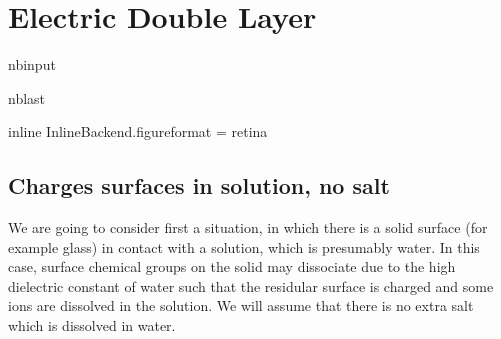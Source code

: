 \documentclass[letterpaper,10pt,english]{sphinxmanual}
\begin{document}
\chapter{Electric Double Layer}
\label{\detokenize{notebooks/L9/1_Electric_Double_Layer:Electric-Double-Layer}}\label{\detokenize{notebooks/L9/1_Electric_Double_Layer::doc}}
\begin{sphinxuseclass}{nbinput}
\begin{sphinxuseclass}{nblast}
{
\begin{sphinxVerbatim}[commandchars=\\\{\}]
\llap{\color{nbsphinxin}[66]:\,\hspace{\fboxrule}\hspace{\fboxsep}}   
   
   
   
      
   
 

 inline
 InlineBackend.figure\PYGZus{}format = \PYGZsq{}retina\PYGZsq{}

    
      

\end{sphinxVerbatim}
}

\end{sphinxuseclass}
\end{sphinxuseclass}

\section{Charges surfaces in solution, no salt}
\label{\detokenize{notebooks/L9/1_Electric_Double_Layer:Charges-surfaces-in-solution,-no-salt}}
\sphinxAtStartPar
We are going to consider first a situation, in which there is a solid surface (for example glass) in contact with a solution, which is presumably water. In this case, surface chemical groups on the solid may dissociate due to the high dielectric constant of water such that the residular surface is charged and some ions are dissolved in the solution. We will assume that there is no extra salt which is dissolved in water.
\end{document}
